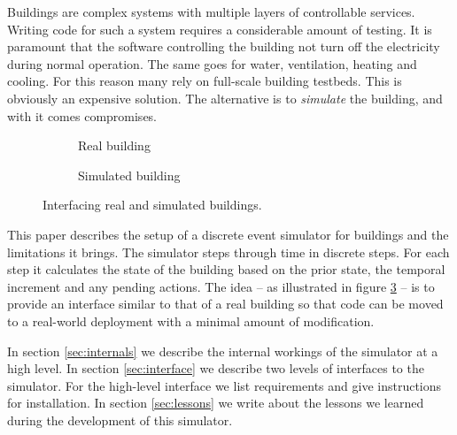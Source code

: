 \documentclass[10pt]{article}
\newcommand{\includeSVG}[1]{
  \texttt{[image: figs/\#1.pdf]}
}
\begin{document}
Buildings are complex systems with multiple layers of controllable services. Writing code for such a system requires a considerable amount of testing. It is paramount that the software controlling the building not turn off the electricity during normal operation. The same goes for water, ventilation, heating and cooling. For this reason many rely on full-scale building testbeds. This is obviously an expensive solution. The alternative is to \textsl{simulate} the building, and with it comes compromises.

\begin{figure}[hb]
  \begin{subfigure}[b]{0.5\textwidth}
    \centering
    \rotatebox{0}{\scalebox{0.6}{\includeSVG{buildinglogic}}}
    \caption{Real building}
    \label{fig:interfacing:real}
  \end{subfigure}
  \begin{subfigure}[b]{0.5\textwidth}
    \centering
    \rotatebox{0}{\scalebox{0.6}{\includeSVG{simulatorlogic}}}
    \caption{Simulated building}
    \label{fig:interfacing:sim}
  \end{subfigure}
  
  \caption{Interfacing real and simulated buildings.}
  \label{fig:interfacing}
\end{figure}

This paper describes the setup of a discrete event simulator for buildings and the limitations it brings. The simulator steps through time in discrete steps. For each step it calculates the state of the building based on the prior state, the temporal increment and any pending actions. The idea -- as illustrated in figure \ref{fig:interfacing} -- is to provide an interface similar to that of a real building so that code can be moved to a real-world deployment with a minimal amount of modification.

In section \ref{sec:internals} we describe the internal workings of the simulator at a high level. In section \ref{sec:interface} we describe two levels of interfaces to the simulator. For the high-level interface we list requirements and give instructions for installation. In section \ref{sec:lessons} we write about the lessons we learned during the development of this simulator.

\end{document}
